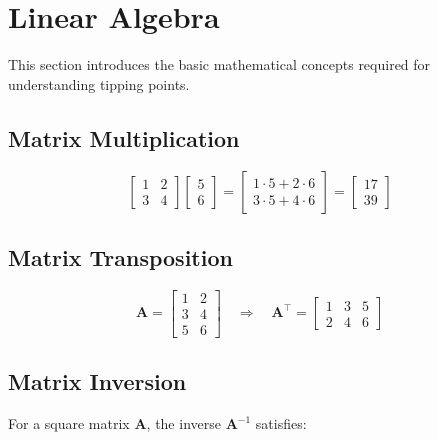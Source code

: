 \documentclass[
]{article}
\author{}
\date{\vspace{-2.5em}}
\begin{document}
\hypertarget{linear-algebra}{%
\section{Linear Algebra}\label{linear-algebra}}

This section introduces the basic mathematical concepts required for
understanding tipping points.

\hypertarget{matrix-multiplication}{%
\subsection{Matrix Multiplication}\label{matrix-multiplication}}

\[
\begin{bmatrix}
1 & 2 \\
3 & 4
\end{bmatrix}
\begin{bmatrix}
5 \\
6
\end{bmatrix}
=
\begin{bmatrix}
1 \cdot 5 + 2 \cdot 6 \\
3 \cdot 5 + 4 \cdot 6
\end{bmatrix}
=
\begin{bmatrix}
17 \\
39
\end{bmatrix}
\]

\hypertarget{matrix-transposition}{%
\subsection{Matrix Transposition}\label{matrix-transposition}}

\[
\mathbf{A} =
\begin{bmatrix}
1 & 2 \\
3 & 4 \\
5 & 6
\end{bmatrix}
\quad \Rightarrow \quad
\mathbf{A}^\top =
\begin{bmatrix}
1 & 3 & 5 \\
2 & 4 & 6
\end{bmatrix}
\]

\hypertarget{matrix-inversion}{%
\subsection{Matrix Inversion}\label{matrix-inversion}}

For a square matrix \(\mathbf{A}\), the inverse \(\mathbf{A}^{-1}\)
satisfies:
\end{document}
